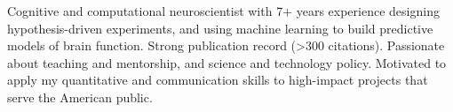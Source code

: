 

\begin{cvparagraph}

Cognitive and computational neuroscientist with 7+ years experience designing hypothesis-driven experiments, and using machine learning to build predictive models of brain function. Strong publication record (>300 citations). Passionate about teaching and mentorship, and science and technology policy. Motivated to apply my quantitative and communication skills to high-impact projects that serve the American public. 

\end{cvparagraph}
